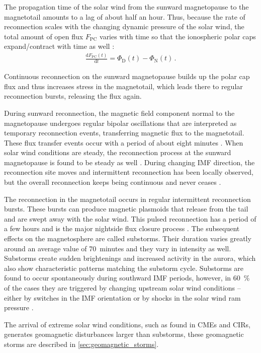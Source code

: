 The propagation time of the solar wind from the sunward magnetopause to the magnetotail amounts to a lag of about half an hour. Thus, because the rate of reconnection scales with the changing dynamic pressure of the solar wind, the total amount of open flux $F_\text{PC}$ varies with time so that the ionospheric polar caps expand/contract with time as well \citep{Siscoe1985}:
\begin{align}
	\frac{\text{d}F_\text{PC}(t)}{\text{d}t} = \Phi_\text{D}(t) - \Phi_\text{N}(t)	\,.	\label{eq:faradays_law}
\end{align}

Continuous reconnection on the sunward magnetopause builds up the polar cap flux and thus increases stress in the magnetotail, which leads there to regular reconnection bursts, releasing the flux again.

During sunward reconnection, the magnetic field component normal to the magnetopause undergoes regular bipolar oscillations that are interpreted as temporary reconnection events, transferring magnetic flux to the magnetotail. These flux transfer events occur with a period of about eight minutes \citep{Russell1996}. When solar wind conditions are steady, the reconnection process at the sunward magnetopause is found to be steady as well \citep{Phan2005}. During changing IMF direction, the reconnection site moves and intermittent reconnection has been locally observed, but the overall reconnection keeps being continuous and never ceases \citep{Phan2005}.

The reconnection in the magnetotail occurs in regular intermittent reconnection bursts. These bursts can produce magnetic plasmoids that release from the tail and are swept away with the solar wind. This pulsed reconnection has a period of a few hours and is the major nightside flux closure process \citep{Milan2007}. The subsequent effects on the magnetosphere are called substorms. Their duration varies greatly around an average value of 70~minutes and they vary in intensity as well. Substorms create sudden brightenings and increased activity in the aurora, which also show characteristic patterns matching the substorm cycle. Substorms are found to occur spontaneously during southward IMF periods, however, in \SI{60}{\percent} of the cases they are triggered by changing upstream solar wind conditions -- either by switches in the IMF orientation or by shocks in the solar wind ram pressure \citep{Milan2007}.

The arrival of extreme solar wind conditions, such as found in CMEs and CIRs, generates geomagnetic disturbances larger than substorms, these geomagnetic storms are described in \autoref{sec:geomagnetic_storms}.



